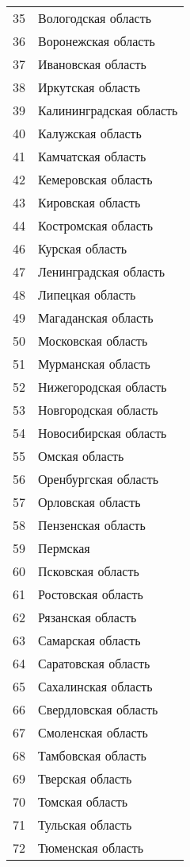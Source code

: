 \documentclass[10pt, a4paper, titlepage]{article}
\begin{document}
\begin{xtabular}{rp{.35\textwidth}}
    35 & Вологодская область \\
    36 & Воронежская область \\
    37 & Ивановская область \\
    38 & Иркутская область \\
    39 & Калининградская область \\
    40 & Калужская область \\
    41 & Камчатская область \\
    42 & Кемеровская область \\
    43 & Кировская область \\
    44 & Костромская область \\
    46 & Курская область \\
    47 & Ленинградская область \\
    48 & Липецкая область \\
    49 & Магаданская область \\
    50 & Московская область \\
    51 & Мурманская область \\
    52 & Нижегородская область \\
    53 & Новгородская область \\
    54 & Новосибирская область \\
    55 & Омская область \\
    56 & Оренбургская область \\
    57 & Орловская область \\
    58 & Пензенская область \\
    59 & Пермская  \\
    60 & Псковская область \\
    61 & Ростовская область \\
    62 & Рязанская область \\
    63 & Самарская область \\
    64 & Саратовская область \\
    65 & Сахалинская область \\
    66 & Свердловская область \\
    67 & Смоленская область \\
    68 & Тамбовская область \\
    69 & Тверская область \\
    70 & Томская область \\
    71 & Тульская область \\
    72 & Тюменская область \\

\end{xtabular}
\end{document}

